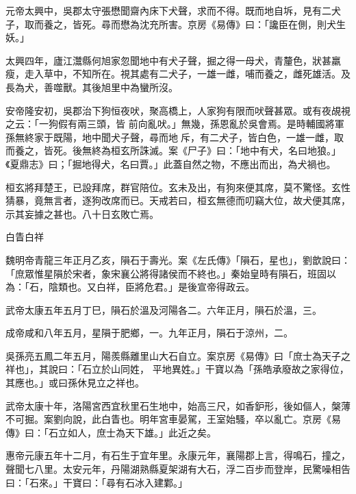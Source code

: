 \begin{pinyinscope}
 元帝太興中，吳郡太守張懋聞齋內床下犬聲，求而不得。既而地自坼，見有二犬子，取而養之，皆死。尋而懋為沈充所害。京房《易傳》曰：「讒臣在側，則犬生妖。」



 太興四年，廬江灊縣何旭家忽聞地中有犬子聲，掘之得一母犬，青釐色，狀甚羸瘦，走入草中，不知所在。視其處有二犬子，一雄一雌，哺而養之，雌死雄活。及長為犬，善噬獸。其後旭里中為蠻所沒。



 安帝隆安初，吳郡治下狗恒夜吠，聚高橋上，人家狗有限而吠聲甚眾。或有夜覘視之云：「一狗假有兩三頭，皆
 前向亂吠。」無幾，孫恩亂於吳會焉。是時輔國將軍孫無終家于既陽，地中聞犬子聲，尋而地斥，有二犬子，皆白色，一雄一雌，取而養之，皆死。後無終為桓玄所誅滅。案《尸子》曰：「地中有犬，名曰地狼。」《夏鼎志》曰；「掘地得犬，名曰賈。」此蓋自然之物，不應出而出，為犬禍也。



 桓玄將拜楚王，已設拜席，群官陪位。玄未及出，有狗來便其席，莫不驚怪。玄性猜暴，竟無言者，逐狗改席而已。天戒若曰，桓玄無德而叨竊大位，故犬便其席，示其妄據之甚也。八十日玄敗亡焉。



 白眚白祥



 魏明帝青龍三年正月乙亥，隕石于壽光。案《左氏傳》「隕石，星也」，劉歆說曰：「庶眾惟星隕於宋者，象宋襄公將得諸侯而不終也。」秦始皇時有隕石，班固以為：「石，陰類也。又白祥，臣將危君。」是後宣帝得政云。



 武帝太康五年五月丁巳，隕石於溫及河陽各二。六年正月，隕石於溫，三。



 成帝咸和八年五月，星隕于肥鄉，一。九年正月，隕石于涼州，二。



 吳孫亮五鳳二年五月，陽羨縣離里山大石自立。案京房《易傳》曰「庶士為天子之祥也」，其說曰：「石立於山同姓，
 平地異姓。」干寶以為「孫皓承廢故之家得位，其應也。」或曰孫休見立之祥也。



 武帝太康十年，洛陽宮西宜秋里石生地中，始高三尺，如香鈩形，後如傴人，槃薄不可掘。案劉向說，此白眚也。明年宮車晏駕，王室始騷，卒以亂亡。京房《易傳》曰：「石立如人，庶士為天下雄。」此近之矣。



 惠帝元康五年十二月，有石生于宜年里。永康元年，襄陽郡上言，得鳴石，撞之，聲聞七八里。太安元年，丹陽湖熟縣夏架湖有大石，浮二百步而登岸，民驚噪相告曰：「石來。」干寶曰：「尋有石冰入建鄴。」




\end{pinyinscope}
